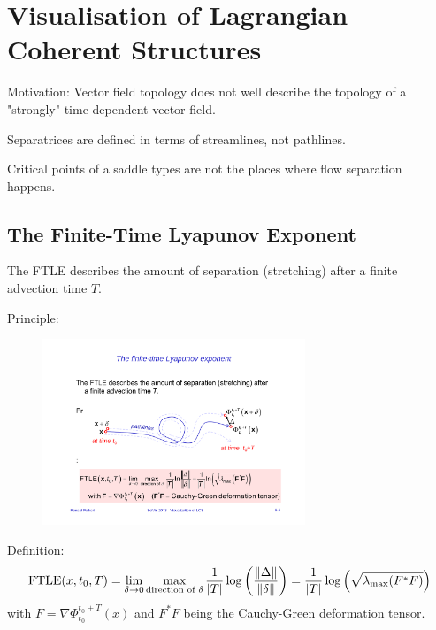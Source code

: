 \section{Visualisation of Lagrangian Coherent Structures}

Motivation: Vector field topology does not well describe the topology of a "strongly" time-dependent vector field. 
\begin{description}
\item Separatrices are defined in terms of streamlines, not pathlines.
\item Critical points of a saddle types are not the places where flow separation happens.
\end{description}

\subsection{The Finite-Time Lyapunov Exponent}
The FTLE describes the amount of separation (stretching) after a finite advection time $T$.

Principle:
\begin{figure}[H]
    \centering
    \includegraphics[width=0.7\textwidth]{img/09_ftle}
\end{figure}
Definition:
\begin{align*}
    \text{FTLE}(x,t_0,T) = \lim_{\delta\rightarrow 0} \max_{\text{direction of }\delta} {1\over |T|} \log\left( {\left\lVert\Delta\right\rVert\over \left\lVert\delta\right\rVert}\right)  = {1\over |T|} \log\left(
        \sqrt{\lambda_{\max} (F^*F)}
    \right)
\end{align*}
with $F=\nabla \Phi_{t_0}^{t_0+T} (x)$ and $F^* F$ being the Cauchy-Green deformation tensor.

